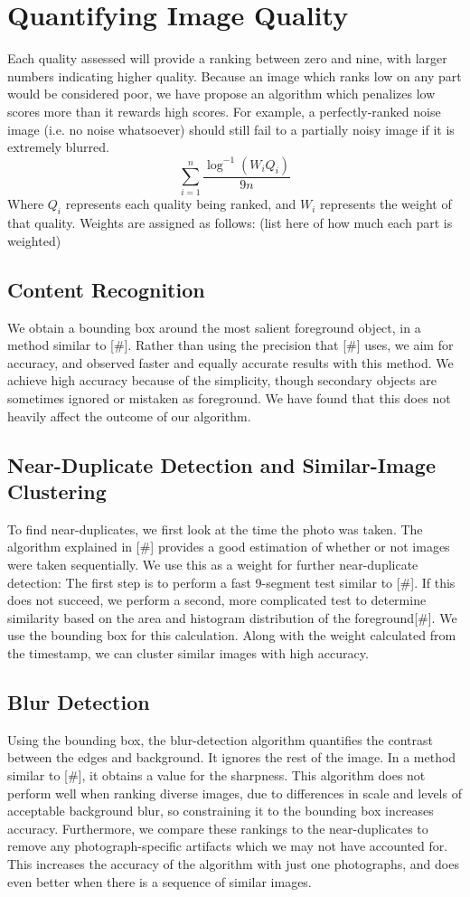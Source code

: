 \documentclass[twocolumn]{article}
\begin{document}
\section{Quantifying Image Quality}
Each quality assessed will provide a ranking between zero and nine, with larger numbers indicating higher quality. Because an image which ranks low on any part would be considered poor, we have propose an algorithm which penalizes low scores more than it rewards high scores. For example, a perfectly-ranked noise image (i.e. no noise whatsoever) should still fail to a partially noisy image if it is extremely blurred.
\[
\displaystyle\sum\limits_{i=1}^n\frac{\log^{-1}(W_iQ_i)}{9n}
\]
Where \(Q_i\) represents each quality being ranked, and \(W_i\) represents the weight of that quality. Weights are assigned as follows: (list here of how much each part is weighted)
\subsection{Content Recognition}
We obtain a bounding box around the most salient foreground object, in a method similar to [\#]. Rather than using the precision that [\#] uses, we aim for accuracy, and observed faster and equally accurate results with this method. We achieve high accuracy because of the simplicity, though secondary objects are sometimes ignored or mistaken as foreground. We have found that this does not heavily affect the outcome of our algorithm.
\subsection{Near-Duplicate Detection and Similar-Image Clustering}
To find near-duplicates, we first look at the time the photo was taken. The algorithm explained in [\#] provides a good estimation of whether or not images were taken sequentially. We use this as a weight for further near-duplicate detection:
The first step is to perform a fast 9-segment test similar to [\#]. If this does not succeed, we perform a second, more complicated test to determine similarity based on the area and histogram distribution of the foreground[\#]. We use the bounding box for this calculation.
Along with the weight calculated from the timestamp, we can cluster similar images with high accuracy.
\subsection{Blur Detection}
Using the bounding box, the blur-detection algorithm quantifies the contrast between the edges and background. It ignores the rest of the image. In a method similar to [\#], it obtains a value for the sharpness. This algorithm does not perform well when ranking diverse images, due to differences in scale and levels of acceptable background blur, so constraining it to the bounding box increases accuracy. Furthermore, we compare these rankings to the near-duplicates to remove any photograph-specific artifacts which we may not have accounted for. This increases the accuracy of the algorithm with just one photographs, and does even better when there is a sequence of similar images.
\end{document}
